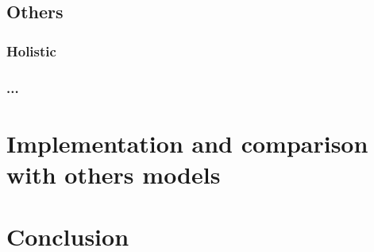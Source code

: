 \documentclass[letterpaper, 12pt]{report}
\begin{document}
\section{Others}
\subsection{Holistic}
\subsection{...}

\chapter{Implementation and comparison with others models}
\chapter{Conclusion}






\newpage
\appendix
\end{document}
